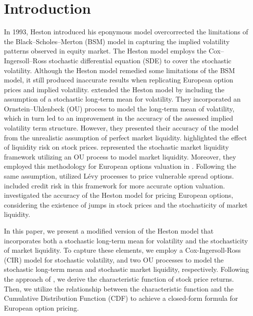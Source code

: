 \documentclass[twoside]{article}
\begin{document}
\section{Introduction}
In 1993, Heston introduced his eponymous model overcorrected the limitations of the Black–Scholes–Merton (BSM) model in capturing 
the implied volatility patterns observed in equity market. The Heston model employs the Cox–Ingersoll–Ross stochastic differential equation (SDE) to cover 
the stochastic volatility. Although the Heston model remedied some limitations of the BSM model, it still produced inaccurate results when replicating 
European option prices and implied volatility.
\cite{He:Chen:2021} extended the Heston model by including the assumption of a stochastic long‑term mean for volatility. They incorporated 
an Ornstein–Uhlenbeck (OU) process to model the long‑term mean of volatility, which in turn led to an improvement in the accuracy of the assessed implied 
volatility term structure. However, they presented their accuracy of the model from the unrealistic assumption of perfect market liquidity.
%
\cite{Amihud:Mendelson:1986} highlighted the effect of liquidity risk on stock prices. \cite{Feng:Hung:Wang:2014} 
represented the stochastic market liquidity framework utilizing an OU process to model market liquidity. Moreover, they employed this methodology for 
European options valuation in \cite{Feng:Hung:Wang:2016}. Following the same assumption, \cite{Cai:Wang:Yu:2024} utilized Lévy processes to 
price vulnerable spread options. \cite{He:Huang:Lin:2025} included credit risk in this framework for more accurate option valuation.  
\cite{Yahyavi:Modarresi:2026} investigated the accuracy of the Heston model for pricing European options, considering the existence 
of jumps in stock prices and the stochasticity of market liquidity.

\noindent
In this paper, we present a modified version of the Heston model that incorporates both a stochastic long-term mean for volatility and the stochasticity of 
market liquidity. To capture these elements, we employ a Cox-Ingersoll-Ross (CIR) model for stochastic volatility, and two OU processes to model the 
stochastic long-term mean and stochastic market liquidity, respectively. Following the approach of \cite{Duffie:Pan:Singleton:2000}, we derive the 
characteristic function of stock price returns. Then, we utilize the relationship between the characteristic function and the Cumulative Distribution Function 
(CDF) to achieve a closed-form formula for European option pricing.
\end{document}
